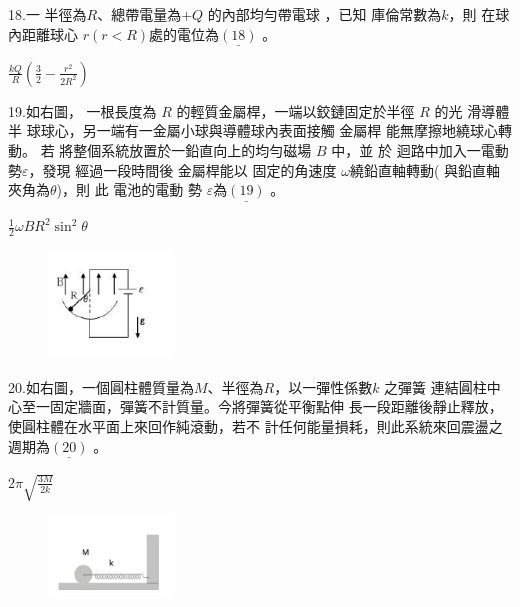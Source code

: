 \documentclass[cn,10pt,math=newtx,chinesefont=founder,device=ig]{elegantbook}
\begin{document}
\newpage



\begin{example}
   18.一 半徑為$R$、總帶電量為$+Q$ 的內部均勻帶電球 ，已知 庫倫常數為$k$，則 在球內距離球心
$r(r<R)處$的電位為$\underline{(18)}$ 。\\
    \rightline{[文華高中教甄109]}
\end{example}
\begin{solution}
    $\frac{kQ}{R}(\frac{3}{2}-\frac{r^2}{2R^2})$
\end{solution}

\newpage


\begin{example}
   19.如右圖， 一根長度為 $R$ 的輕質金屬桿，一端以鉸鏈固定於半徑 $R$ 的光
滑導體 半 球球心，另一端有一金屬小球與導體球內表面接觸 金屬桿
能無摩擦地繞球心轉動。 若 將整個系統放置於一鉛直向上的均勻磁場
$B$ 中，並 於 迴路中加入一電動勢$\varepsilon$，發現 經過一段時間後 金屬桿能以
固定的角速度 $\omega$繞鉛直軸轉動( 與鉛直軸夾角為$\theta$)，則 此 電池的電動
勢 $\varepsilon$為$\underline{(19)}$ 。\\
    \rightline{[文華高中教甄109]}
\end{example}
\begin{solution}
    $\frac{1}{2} \omega BR^2 \sin^2 {\theta}$
\end{solution}
\begin{figure}[htbp]
    \flushright
    \includegraphics[width=0.3\textwidth]{image/109文華19.png}
  \end{figure}
\newpage


\begin{example}
   20.如右圖，一個圓柱體質量為$M$、半徑為$R$，以一彈性係數$k$ 之彈簧
連結圓柱中心至一固定牆面，彈簧不計質量。今將彈簧從平衡點伸
長一段距離後靜止釋放，使圓柱體在水平面上來回作純滾動，若不
計任何能量損耗，則此系統來回震盪之週期為$\underline{(20)}$ 。\\
    \rightline{[文華高中教甄109]}
\end{example}
\begin{solution}
    $2\pi \sqrt{\frac{3M}{2k}}$
\end{solution}
\begin{figure}[htbp]
    \flushright
    \includegraphics[width=0.3\textwidth]{image/109文華20.png}
  \end{figure}
\newpage
\end{document}
